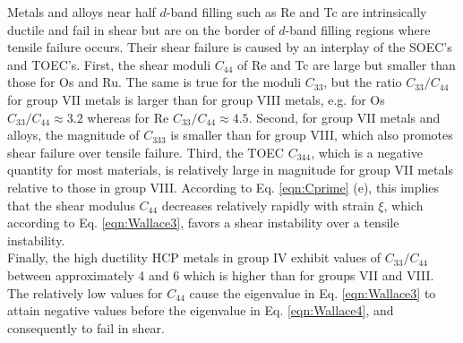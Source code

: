 \documentclass[showpacs,aps,floatfix,prb,reprint,superscriptaddress]{revtex4-1}
\begin{document}
Metals and alloys near half $d$-band filling such as Re and Tc are intrinsically ductile and fail in shear but are on the border of $d$-band filling regions where tensile failure occurs. Their shear failure is caused by an interplay of the SOEC's and TOEC's. First, the shear moduli $C_{44}$ of Re and Tc are large but smaller than those for Os and Ru. The same is true for the moduli $C_{33}$, but the ratio $C_{33}/C_{44}$ for group VII metals is larger than for group VIII metals, e.g. for Os  $C_{33}/C_{44} \approx 3.2$ whereas for Re $C_{33}/C_{44} \approx 4.5$. Second, for group VII metals and alloys, the magnitude of $C_{333}$ is smaller than for group VIII, which also promotes shear failure over tensile failure. Third, the TOEC $C_{344}$, which is a negative quantity for most materials, is relatively large in magnitude for group VII metals relative to those in group VIII. According to Eq. \ref{eqn:Cprime} (e), this implies that the shear modulus $C_{44}$ decreases relatively rapidly with strain $\xi$, which according to Eq. \ref{eqn:Wallace3}, favors a shear instability over a tensile instability.  \\

Finally, the high ductility HCP metals in group IV exhibit values of $C_{33}/C_{44}$ between approximately 4 and 6 which is higher than for groups VII and VIII. The relatively low values for $C_{44}$ cause the eigenvalue in Eq. \ref{eqn:Wallace3} to attain negative values before the eigenvalue in Eq. \ref{eqn:Wallace4}, and consequently to fail in shear.
\end{document}
